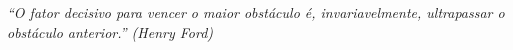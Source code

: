 %
%

\begin{epigrafe}
    \vspace*{\fill}
	\begin{flushright}
		\textit{``O fator decisivo para vencer o maior obstáculo é, invariavelmente, ultrapassar o obstáculo anterior.'' (Henry Ford)}
	\end{flushright}
\end{epigrafe}
